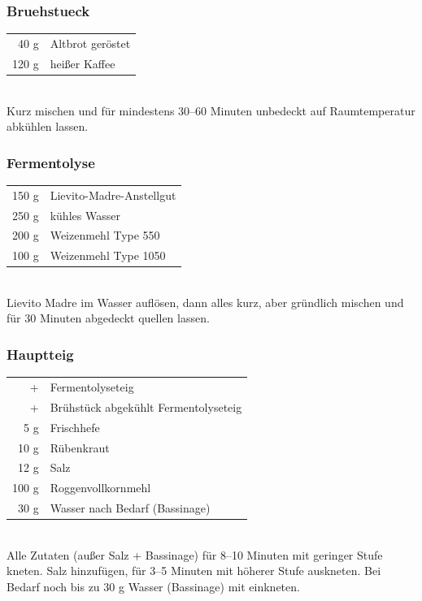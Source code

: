 \documentclass[10pt,a4paper,ngerman, DIV=16]{scrartcl}
\begin{document}
\subsubsection*{\Gls{Bruehstueck}}
\begin{tabular}{r l}
    40 g & Altbrot geröstet\\
    120 g & heißer Kaffee\\
\end{tabular}\\

Kurz mischen und für mindestens 30–60 Minuten unbedeckt auf Raumtemperatur abkühlen lassen.

\subsubsection*{\Gls{Fermentolyse}}
\begin{tabular}{r l}
    150 g & Lievito-Madre-Anstellgut \\
    250 g & kühles Wasser\\
    200 g & Weizenmehl Type 550\\
    100 g & Weizenmehl Type 1050\\
\end{tabular}\\

Lievito Madre im Wasser auflösen, dann alles kurz, aber gründlich mischen und für 30 Minuten abgedeckt quellen lassen.


\subsubsection*{Hauptteig}
\begin{tabular}{r l}
    + & Fermentolyseteig                     \\
    + & Brühstück abgekühlt Fermentolyseteig \\
    5 g & Frischhefe                           \\
    10 g & Rübenkraut                           \\
    12 g & Salz                                 \\
    100 g & Roggenvollkornmehl                   \\
    30 g & Wasser nach Bedarf (\Gls{Bassinage})
\end{tabular}\\

Alle Zutaten (außer Salz + Bassinage) für 8–10 Minuten mit geringer Stufe kneten. Salz hinzufügen, für 3–5 Minuten mit höherer Stufe auskneten. Bei Bedarf noch bis zu 30 g Wasser (Bassinage) mit einkneten.
\end{document}
